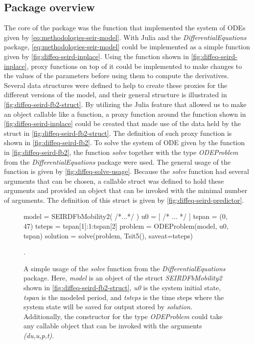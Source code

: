 \subsection{Package overview}

The core of the package was the function that implemented the system of \glspl{ODE} given by \autoref{eq:methodologies-seir-model}.
With Julia and the \textit{DifferentialEquations} package, \autoref{eq:methodologies-seir-model} could be implemented as a simple function given by \autoref{fig:diffeq-seird-inplace}.
Using the function shown in \autoref{fig:diffeq-seird-inplace}, proxy functions on top of it could be implemented to make changes to the values of the parameters before using them to compute the derivatives.
Several data structures were defined to help to create these proxies for the different versions of the model, and their general structure is illustrated in \autoref{fig:diffeq-seird-fb2-struct}.
By utilizing the Julia feature that allowed us to make an object callable like a function, a proxy function around the function shown in \autoref{fig:diffeq-seird-inplace} could be created that made use of the data held by the struct in \autoref{fig:diffeq-seird-fb2-struct}.
The definition of such proxy function is shown in \autoref{fig:diffeq-seird-fb2}.
To solve the system of \gls{ODE} given by the function in \autoref{fig:diffeq-seird-fb2}, the function \textit{solve} together with the type \textit{ODEProblem} from the \textit{DifferentialEquations} package were used.
The general usage of the function is given by \autoref{fig:diffeq-solve-usage}.
Because the \textit{solve} function had several arguments that can be chosen, a callable struct was defined to hold these arguments and provided an object that can be invoked with the minimal number of arguments.
The definition of this struct is given by \autoref{fig:diffeq-seird-predictor}.

\begin{figure}[!htb]
\begin{jllisting}
model = SEIRDFbMobility2( /*...*/ )
u0 = [ /* ... */ ]
tspan = (0, 47)
tsteps = tspan[1]:1:tspan[2]
problem = ODEProblem(model, u0, tspan)
solution = solve(problem, Tsit5(), saveat=tsteps)
\end{jllisting}
\caption{A simple usage of the \textit{solve} function from the \textit{DifferentialEquations} package. Here, \textit{model} is an object of the struct \textit{SEIRDFbMobility2} shown in \autoref{fig:diffeq-seird-fb2-struct}, \textit{u0} is the system initial state, \textit{tspan} is the modeled period, and \textit{tsteps} is the time steps where the system state will be saved for output stored by \textit{solution}. Additionally, the constructor for the type \textit{ODEProblem} could take any callable object that can be invoked with the arguments \textit{(du,u,p,t)}.}.
\label{fig:diffeq-solve-usage}
\end{figure}

